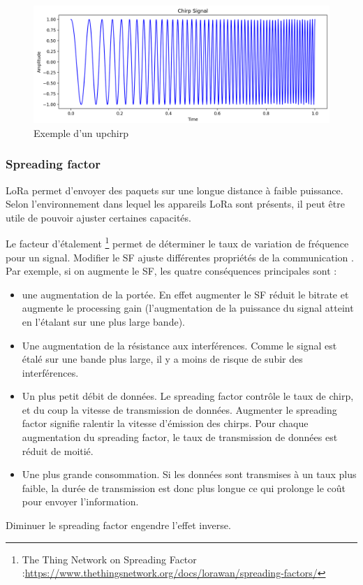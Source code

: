 \begin{figure}[h]
\centering

\includegraphics[scale=0.18]{images/CSSupchirp.png}
\caption{Exemple d'un upchirp}\label{term5}
\end{figure}

\subsubsection{Spreading factor}

LoRa permet d'envoyer des paquets sur une longue distance à faible puissance. Selon l'environnement dans lequel les appareils LoRa sont présents, il peut être utile de pouvoir ajuster certaines capacités.

\vspace{0.1cm}

Le facteur d'étalement \footnote{The Thing Network on Spreading Factor :\href{https://www.thethingsnetwork.org/docs/lorawan/spreading-factors/}{https://www.thethingsnetwork.org/docs/lorawan/spreading-factors/}} permet de déterminer le taux de variation de fréquence pour un signal. Modifier le \ac{SF} ajuste différentes propriétés de la communication . Par exemple, si on augmente le \ac{SF}, les quatre conséquences principales sont :

\vspace{0.1cm}

\begin{itemize}
\item une augmentation de la portée. En effet augmenter le SF réduit le bitrate et augmente le processing gain (l'augmentation de la puissance du signal atteint en l'étalant sur une plus large bande).
\item Une augmentation de la résistance aux interférences. Comme le signal est étalé sur une bande plus large, il y a moins de risque de subir des interférences.
\item Un plus petit débit de données. Le spreading factor contrôle le taux de chirp, et du coup la vitesse de transmission de données. Augmenter le spreading factor signifie ralentir la vitesse d'émission des chirps. Pour chaque augmentation du spreading factor, le taux de transmission de données est réduit de moitié.
\item Une plus grande consommation. Si les données sont transmises à un taux plus faible, la durée de transmission est donc plus longue ce qui prolonge le coût pour envoyer l'information.
\end{itemize}
Diminuer le spreading factor engendre l'effet inverse.


